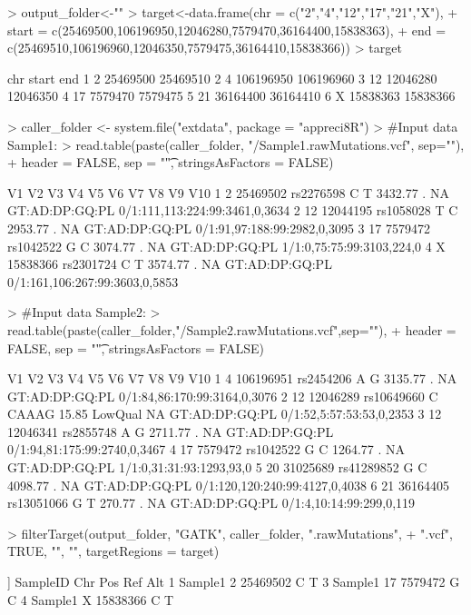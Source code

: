 \documentclass{article}
\begin{document}
\begin{Schunk}
\begin{Sinput}
> output_folder<-""
> target<-data.frame(chr = c("2","4","12","17","21","X"),
+                    start = c(25469500,106196950,12046280,7579470,36164400,15838363),
+                    end = c(25469510,106196960,12046350,7579475,36164410,15838366))
> target
\end{Sinput}
\begin{Soutput}
  chr     start       end
1   2  25469500  25469510
2   4 106196950 106196960
3  12  12046280  12046350
4  17   7579470   7579475
5  21  36164400  36164410
6   X  15838363  15838366
\end{Soutput}
\begin{Sinput}
> caller_folder <- system.file("extdata", package = "appreci8R")
> #Input data Sample1:
> read.table(paste(caller_folder, "/Sample1.rawMutations.vcf", sep=""),
+            header = FALSE, sep = "\t", stringsAsFactors = FALSE)
\end{Sinput}
\begin{Soutput}
  V1       V2        V3 V4 V5      V6 V7 V8             V9                            V10
1  2 25469502 rs2276598  C  T 3432.77  . NA GT:AD:DP:GQ:PL 0/1:111,113:224:99:3461,0,3634
2 12 12044195 rs1058028  T  C 2953.77  . NA GT:AD:DP:GQ:PL   0/1:91,97:188:99:2982,0,3095
3 17  7579472 rs1042522  G  C 3074.77  . NA GT:AD:DP:GQ:PL      1/1:0,75:75:99:3103,224,0
4  X 15838366 rs2301724  C  T 3574.77  . NA GT:AD:DP:GQ:PL 0/1:161,106:267:99:3603,0,5853
\end{Soutput}
\begin{Sinput}
> #Input data Sample2:
> read.table(paste(caller_folder,"/Sample2.rawMutations.vcf",sep=""),
+            header = FALSE, sep = "\t", stringsAsFactors = FALSE)
\end{Sinput}
\begin{Soutput}
  V1        V2         V3 V4    V5      V6      V7 V8             V9                            V10
1  4 106196951  rs2454206  A     G 3135.77       . NA GT:AD:DP:GQ:PL   0/1:84,86:170:99:3164,0,3076
2 12  12046289 rs10649660  C CAAAG   15.85 LowQual NA GT:AD:DP:GQ:PL       0/1:52,5:57:53:53,0,2353
3 12  12046341  rs2855748  A     G 2711.77       . NA GT:AD:DP:GQ:PL   0/1:94,81:175:99:2740,0,3467
4 17   7579472  rs1042522  G     C 1264.77       . NA GT:AD:DP:GQ:PL       1/1:0,31:31:93:1293,93,0
5 20  31025689 rs41289852  G     C 4098.77       . NA GT:AD:DP:GQ:PL 0/1:120,120:240:99:4127,0,4038
6 21  36164405 rs13051066  G     T  270.77       . NA GT:AD:DP:GQ:PL       0/1:4,10:14:99:299,0,119
\end{Soutput}
\begin{Sinput}
> filterTarget(output_folder, "GATK", caller_folder, ".rawMutations",
+              ".vcf", TRUE, "", "", targetRegions = target)
\end{Sinput}
\begin{Soutput}
[[1]]
  SampleID Chr      Pos Ref Alt
1  Sample1   2 25469502   C   T
3  Sample1  17  7579472   G   C
4  Sample1   X 15838366   C   T


\end{Soutput}
\end{Schunk}
\end{document}
